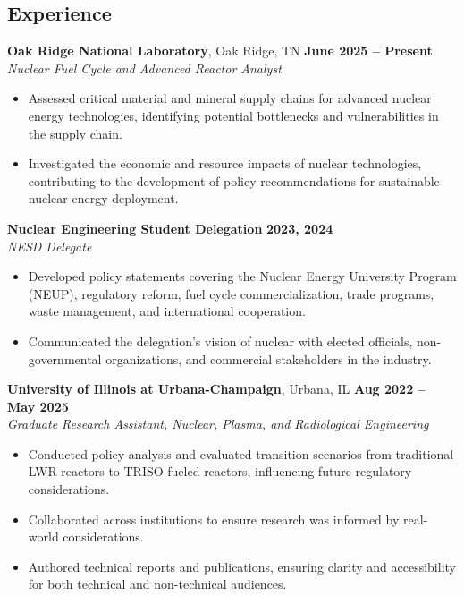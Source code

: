 \documentclass[margin,line]{resume}
\begin{document}
\begin{resume}
    \section{\mysidestyle Experience}
    \textbf{Oak Ridge National Laboratory}, Oak Ridge, TN \hfill \textbf{June 2025 -- Present} \\
    \textsl{Nuclear Fuel Cycle and Advanced Reactor Analyst} \\
    \begin{itemize}
        \item Assessed critical material and mineral supply chains for advanced nuclear energy technologies, identifying potential bottlenecks and vulnerabilities in the supply chain.
        \item Investigated the economic and resource impacts of nuclear technologies, contributing to the development of policy recommendations for sustainable nuclear energy deployment.
    \end{itemize}

    \textbf{Nuclear Engineering Student Delegation} \hfill \textbf{2023, 2024} \\
    \textsl{NESD Delegate} \\
    \begin{itemize}
        \item Developed policy statements covering the Nuclear Energy University Program (NEUP), regulatory reform, fuel cycle commercialization, trade programs, waste management, and international cooperation.
        \item Communicated the delegation's vision of nuclear with elected officials, non-governmental organizations, and commercial stakeholders in the industry.
    \end{itemize}

    \textbf{University of Illinois at Urbana-Champaign}, Urbana, IL \hfill \textbf{Aug 2022 -- May 2025} \\
    \textsl{Graduate Research Assistant, Nuclear, Plasma, and Radiological Engineering} \\
    \begin{itemize}
        \item Conducted policy analysis and evaluated transition scenarios from traditional LWR reactors to TRISO-fueled reactors, influencing future regulatory considerations.
        \item Collaborated across institutions to ensure research was informed by real-world considerations.
        \item Authored technical reports and publications, ensuring clarity and accessibility for both technical and non-technical audiences.
    \end{itemize}


\end{resume}
\end{document}
